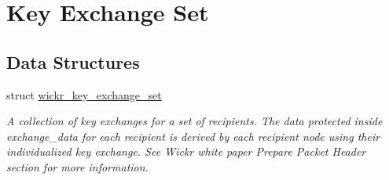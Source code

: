 \hypertarget{group__wickr__key__exchange__set}{}\section{Key Exchange Set}
\label{group__wickr__key__exchange__set}
\subsection*{Data Structures}
\begin{DoxyCompactItemize}
\item 
struct \mbox{\hyperlink{structwickr__key__exchange__set}{wickr\+\_\+key\+\_\+exchange\+\_\+set}}
\begin{DoxyCompactList}\small\item\em A collection of key exchanges for a set of recipients. The data protected inside \textquotesingle{}exchange\+\_\+data\textquotesingle{} for each recipient is derived by each recipient node using their individualized key exchange. See Wickr white paper \textquotesingle{}Prepare Packet Header\textquotesingle{} section for more information. \end{DoxyCompactList}\end{DoxyCompactItemize}
